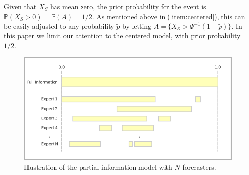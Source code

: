 \documentclass[11pt]{article}
\renewcommand{\P}{\mathbb{P}}
\theoremstyle{definition}
\theoremstyle{definition}
\def\P{{\mathbb P}}
\begin{document}
Given that $X_S$ has mean zero, the prior probability for the event 
is $\P(X_S > 0) = \P(A) = 1/2$.  As mentioned above in (\ref{item:centered}), 
this can be easily adjusted to any probability $\tilde{p}$ by 
letting $A = \{ X_S > \Phi^{-1}(1-\tilde{p}) \}$.  In this paper
we limit our attention to the centered model, with prior probability $1/2$.

\begin{figure}[htbp]
   \includegraphics[width = \textwidth]{N=N} %
   \caption{Illustration of the partial information model with $N$ forecasters.}
   \label{diagramN}
\end{figure}
\end{document}
